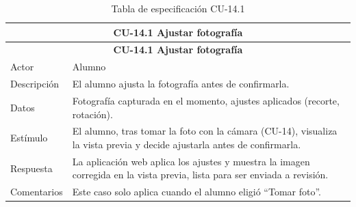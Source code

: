 \begin{longtable}{|p{4cm}|p{11cm}|}
\caption{Tabla de especificación CU-14.1}
\label{tab:cu14-1} \\

\hline
\multicolumn{2}{|c|}{\textbf{CU-14.1 Ajustar fotografía}} \\
\hline
\endfirsthead

\hline
\multicolumn{2}{|c|}{\textbf{CU-14.1 Ajustar fotografía}} \\
\hline
\endhead

\hline
\endfoot
\endlastfoot

Actor & Alumno \\
\hline

Descripción & El alumno ajusta la fotografía antes de confirmarla. \\
\hline

Datos & Fotografía capturada en el momento, ajustes aplicados (recorte, rotación). \\
\hline

Estímulo & El alumno, tras tomar la foto con la cámara (CU-14), visualiza la vista previa y decide ajustarla antes de confirmarla. \\
\hline

Respuesta & La aplicación web aplica los ajustes y muestra la imagen corregida en la vista previa, lista para ser enviada a revisión. \\
\hline

Comentarios & Este caso solo aplica cuando el alumno eligió “Tomar foto”. \\
\hline

\end{longtable}


